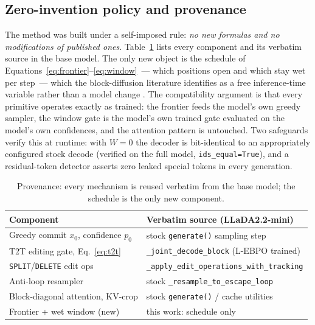 \subsection{Zero-invention policy and provenance}
The method was built under a self-imposed rule: \emph{no new formulas and no
modifications of published ones}. Table~\ref{tab:provenance} lists every component
and its verbatim source in the base model. The only new object is the schedule of
Equations~\eqref{eq:frontier}--\eqref{eq:window}~--- which positions open and which
stay wet per step~--- which the block-diffusion literature identifies as a free
inference-time variable rather than a model change
\citep{bd3lm,setdiffusion}. The compatibility argument is that every primitive
operates exactly as trained: the frontier feeds the model's own greedy sampler, the
window gate is the model's own trained gate evaluated on the model's own
confidences, and the attention pattern is untouched. Two safeguards verify this at
runtime: with $W{=}0$ the decoder is bit-identical to an appropriately configured
stock decode (verified on the full model, \texttt{ids\_equal=True}), and a
residual-token detector asserts zero leaked special tokens in every generation.

\begin{table}[t]
\centering\small
\caption{Provenance: every mechanism is reused verbatim from the base model;
the schedule is the only new component.}\label{tab:provenance}
\begin{tabularx}{\textwidth}{lX}
\toprule
Component & Verbatim source (LLaDA2.2-mini) \\
\midrule
Greedy commit $x_0$, confidence $p_0$ & stock \texttt{generate()} sampling step \\
T2T editing gate, Eq.~\eqref{eq:t2t} & \texttt{\_joint\_decode\_block} (L-EBPO trained) \\
\texttt{SPLIT}/\texttt{DELETE} edit ops & \texttt{\_apply\_edit\_operations\_with\_tracking} \\
Anti-loop resampler & stock \texttt{\_resample\_to\_escape\_loop} \\
Block-diagonal attention, KV-crop & stock \texttt{generate()} / cache utilities \\
Frontier + wet window (new) & this work: schedule only \\
\bottomrule
\end{tabularx}
\end{table}
